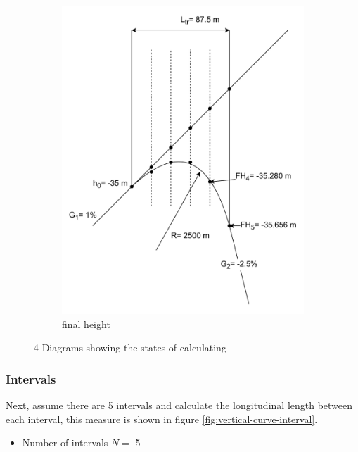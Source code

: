 \documentclass{bcrre_exam}
\begin{document}
\begin{figure}[p]
\begin{subfigure}[b]{0.48\textwidth}
        \includegraphics[width=\textwidth]{images/track-alignment-worksheet-vertical-curve-fh.drawio.pdf}
        \caption{final height}
        \label{fig:vertical-curve-fh}
    \end{subfigure}
    \caption{4 Diagrams showing the states of calculating}
    \label{fig:vertical-curve-diagrams}
\end{figure}

\subsubsection*{Intervals}

Next, assume there are 5 intervals and calculate the longitudinal length between each interval, this measure is shown in figure \ref{fig:vertical-curve-interval}.

\begin{itemize}
    \item Number of intervals $N=$ \num{5}
\end{itemize}
\end{document}

